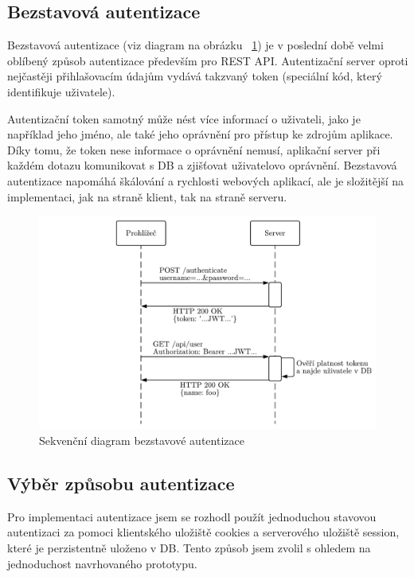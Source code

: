 \subsection{Bezstavová autentizace}\label{subsec:bezstavováAutentizace}
Bezstavová autentizace (viz diagram na obrázku ~\ref{fig:statelessAuthentication}) je v poslední době velmi oblíbený způsob autentizace především pro \gls{REST} \gls{API}.
Autentizační server oproti nejčastěji přihlašovacím údajům vydává takzvaný token (speciální kód, který identifikuje uživatele).

Autentizační token samotný může nést více informací o uživateli, jako je například jeho jméno, ale také jeho oprávnění pro přístup ke zdrojům aplikace.
Díky tomu, že token nese informace o oprávnění nemusí, aplikační server při každém dotazu komunikovat s DB a zjišťovat uživatelovo oprávnění.
Bezstavová autentizace napomáhá škálování a rychlosti webových aplikací, ale je složitější na implementaci, jak na straně klient, tak na straně serveru.

\begin{figure}[ht!]
    \centering
    \includegraphics[width=\textwidth]{partials/navrh/statelessAuthentication.pdf}
    \caption{Sekvenční diagram bezstavové autentizace}\label{fig:statelessAuthentication}
\end{figure}

\subsection{Výběr způsobu autentizace}\label{subsec:výběrZpůsobuAutentizace}
Pro implementaci autentizace jsem se rozhodl použít jednoduchou stavovou autentizaci za pomoci klientského uložiště cookies a serverového uložiště session, které je perzistentně uloženo v DB.
Tento způsob jsem zvolil s ohledem na jednoduchost navrhovaného prototypu.

